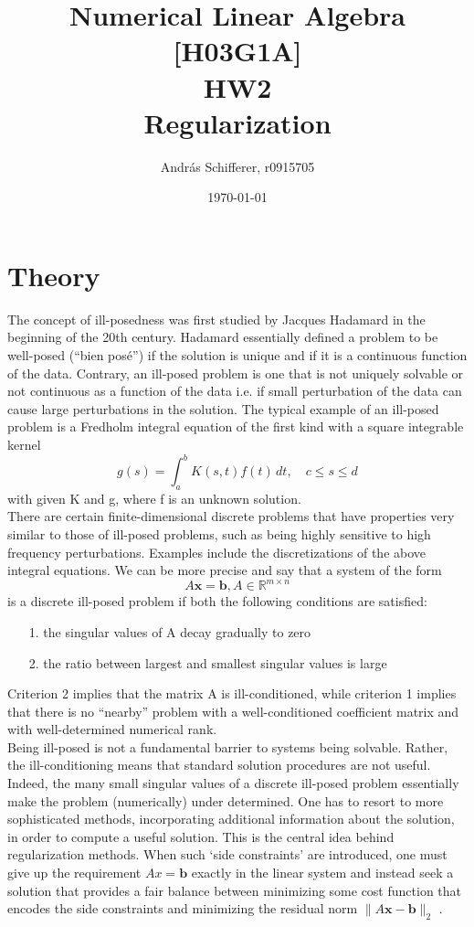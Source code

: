 \documentclass{article}
\author{Andr\'as Schifferer, r0915705}
\title{Numerical Linear Algebra [H03G1A]\\{\LARGE HW2}\\{\large Regularization}}
\date{\today}
\newcommand{\mbf}[1]{\mathbf{#1}}
\begin{document}
	\maketitle
	\tableofcontents
	
	\section{Theory}
	The concept of ill-posedness was first studied by Jacques Hadamard in the beginning of the 20th century. Hadamard essentially defined a problem to be well-posed (“bien posé”) if the solution is unique and if it is a continuous function of the data. Contrary, an ill-posed problem is one that is not
	uniquely solvable or not continuous as a function of the data i.e. if small perturbation of the data can cause large perturbations in the solution.
	The typical example of an ill-posed problem is a Fredholm integral equation of the first kind with a square integrable kernel
	$$g(s)=\int_{a}^{b}K(s,t)f(t) \,d t,\quad c\leq s\leq d$$
	with given K and g, where f is an unknown solution.\\
	There are certain finite-dimensional discrete problems that have properties very similar to those of ill-posed problems, such as being highly sensitive to high frequency perturbations. Examples include the discretizations of the above integral equations. We can be more precise and say that a system of
	the form
	$$A\mathbf{x}=\mathbf{b}, A\in \mathbb{R}^{m\times n}$$
	is a discrete ill-posed problem if both the following conditions are satisfied:
	\begin{itemize}
		\item[1.]the singular values of A decay gradually to zero
		\item[2.]the ratio between largest and smallest singular values is large
	\end{itemize}
	Criterion 2 implies that the matrix A is ill-conditioned, while criterion 1 implies that there is no
	“nearby” problem with a well-conditioned coefficient matrix and with well-determined numerical rank.\\
	Being ill-posed is not a fundamental barrier to systems being solvable. Rather, the ill-conditioning
	means that standard solution procedures are not useful. Indeed, the many small singular values of
	a discrete ill-posed problem essentially make the problem (numerically) under determined. One has
	to resort to more sophisticated methods, incorporating additional information about the solution, in
	order to compute a useful solution. This is the central idea behind regularization methods. When such `side constraints’ are introduced, one must give up the requirement $Ax = \mbf{b}$ exactly in the linear system and instead seek a solution that provides a fair balance between minimizing some cost function that encodes the side constraints and minimizing the residual norm $\|A\mbf{x} -\mbf{b}\|_2$ .\\
	
\end{document}
